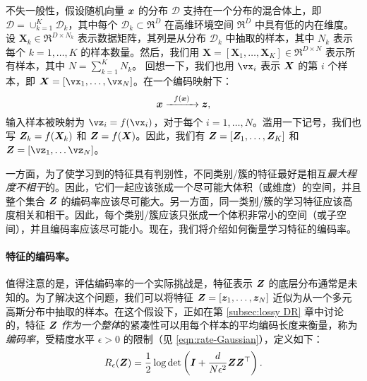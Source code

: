 \documentclass[../../book-main_zh.tex]{subfiles}
\begin{document}

不失一般性，假设随机向量 $\bm{x}$ 的分布 $\mathcal D$ 支持在一个分布的混合体上，即 $\mathcal D = \cup_{k=1}^K \mathcal{D}_k$，其中每个 $\mathcal{D}_k \subset \Re^D$ 在高维环境空间 $\Re^D$ 中具有低的内在维度。设 $\bm X_k \in \Re^{D\times N_k}$ 表示数据矩阵，其列是从分布 $\mathcal{D}_k$ 中抽取的样本，其中 $N_k$ 表示每个 $k=1,\dots,K$ 的样本数量。然后，我们用 $\bm X=[\bm X_1,\dots,\bm X_K] \in \Re^{D\times N}$ 表示所有样本，其中 $N=\sum_{k=1}^K N_k$。
回想一下，我们也用 $\vx_i$ 表示 $\bm{X}$ 的第 $i$ 个样本，即 $\X=[\vx_1,\dots,\vx_N]$。在一个编码映射下：
\begin{equation}
	\bm{x}   \xrightarrow{\hspace{2mm} f(\bm{x})\hspace{2mm}} \bm{z},
\end{equation}
输入样本被映射为 $\vz_i = f(\vx_i)$，对于每个 $i=1,\dots,N$。滥用一下记号，我们也写 $\bm{Z}_k = f(\bm{X}_k)$ 和 $\bm{Z} = f(\bm{X})$。因此，我们有 $\bm{Z} = [\bm Z_1,\dots,\bm Z_K]$ 和 $\Z = [\vz_1,\dots\vz_N]$。

一方面，为了使学习到的特征具有判别性，不同类别/簇的特征最好是相互{\em 最大程度不相干}的。因此，它们一起应该张成一个尽可能大体积（或维度）的空间，并且整个集合 $\bm{Z}$ 的编码率应该尽可能大。另一方面，同一类别/簇的学习特征应该高度相关和相干。因此，每个类别/簇应该只张成一个体积非常小的空间（或子空间），并且编码率应该尽可能小。现在，我们将介绍如何衡量学习特征的编码率。

\paragraph{特征的编码率。} 值得注意的是，评估编码率的一个实际挑战是，特征表示 $\bm{Z}$ 的底层分布通常是未知的。为了解决这个问题，我们可以将特征 $\bm{Z} = [\bm{z}_1, \ldots, \bm{z}_N]$ 近似为从一个多元高斯分布中抽取的样本。在这个假设下，正如在第 \ref{subsec:lossy DR} 章中讨论的，特征 $\bm{Z}$ {\em 作为一个整体}的紧凑性可以用每个样本的平均编码长度来衡量，称为{\em 编码率}，受精度水平 $\epsilon > 0$ 的限制（见 \eqref{eqn:rate-Gaussian}），定义如下：
\begin{equation}
	R_{\epsilon}(\bm{Z}) = \frac{1}{2}\log\det\left(\bm{I} + \frac{d}{N\epsilon^{2}}\bm{Z}\bm{Z}^{\top}\right).
	\label{chap4-eqn:coding-length-eval}
\end{equation}
\end{document}

